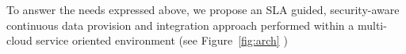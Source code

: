 To answer the needs expressed above, we propose an SLA guided, security-aware continuous data provision and integration approach performed within a multi-cloud service oriented environment  (see
Figure~\ref{fig:arch} )


\begin{figure}
\end{figure}


